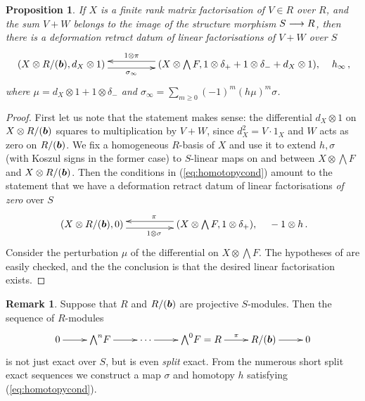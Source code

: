 \documentclass{compositio}
\newtheorem{proposition}[theorem]{Proposition}
\theoremstyle{definition}
\newtheorem{remark}[theorem]{Remark}
\numberwithin{equation}{section}
\begin{document}
\begin{proposition}\label{prop:pertapptechnical} If $X$ is a finite rank matrix factorisation of $V \in R$ over $R$, and the sum $V + W$ belongs to the image of the structure morphism $S \longrightarrow R$, then there is a deformation retract datum of linear factorisations of $V+ W$ over $S$
\begin{equation}\label{eq:pre_perturb_htm3}
\xymatrix@C+2pc{
(X \otimes R/(\bb), d_X \otimes 1) \ar@<-0.8ex>[r]_-{\sigma_\infty} & (X \otimes \bigwedge F, 1 \otimes \delta_+ + 1 \otimes \delta_{-} + d_X \otimes 1), \ar@<-0.8ex>[l]_-{1 \otimes \pi}
} \quad h_\infty\,,
\end{equation}
where $\mu = d_X \otimes 1 + 1 \otimes \delta_-$ and $\sigma_\infty = \sum_{m \ge 0} (-1)^m (h \mu)^m \sigma$.
\end{proposition}
\begin{proof}
First let us note that the statement makes sense: the differential $d_X \otimes 1$ on $X \otimes R/(\boldsymbol{b})$ squares to multiplication by $V + W$, since $d_X^2 = V \cdot 1_X$ and $W$ acts as zero on $R/(\boldsymbol{b})$. We fix a homogeneous $R$-basis of $X$ and use it to extend $h, \sigma$ (with Koszul signs in the former case) to $S$-linear maps on and between $X \otimes \bigwedge F$ and $X \otimes R/(\boldsymbol{b})$. Then the conditions in (\ref{eq:homotopycond}) amount to the statement that we have a deformation retract datum of linear factorisations \emph{of zero} over $S$
\[
\xymatrix@C+2pc{
(X \otimes R/(\bb), 0) \ar@<-0.8ex>[r]_{1 \otimes \sigma} & (X \otimes \bigwedge F, 1 \otimes \delta_+), \ar@<-0.8ex>[l]_{\pi}
} \quad - 1 \otimes h \, .
\]
Consider the perturbation $\mu$ of the differential on $X \otimes \bigwedge F$. The hypotheses of \cite[Proposition 6.1]{dm1102.2957} are easily checked, and the the conclusion is that the desired linear factorisation exists.
\end{proof}

\begin{remark}\label{remark:splitexactsequenceskos}
Suppose that $R$ and $R/(\boldsymbol{b})$ are projective $S$-modules. Then the sequence of $R$-modules
\begin{equation}\label{eq:koszulexactseq}
\xymatrix{
0 \ar[r] & {\bigwedge}^n F \ar[r] & \cdots \ar[r] & {\bigwedge}^0 F = R \ar[r]^-{\pi} & R/(\bb) \ar[r] & 0
}
\end{equation}
is not just exact over $S$, but is even \emph{split} exact. From the numerous short split exact sequences we construct a map $\sigma$ and homotopy $h$ satisfying (\ref{eq:homotopycond}).
\end{remark}
\end{document}
